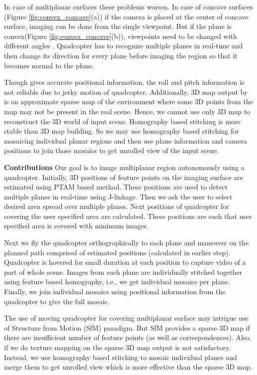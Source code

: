 In case of multiplanar surfaces these problems worsen. In case of concave
surfaces (Figure \ref{fig:convex_concave}(a)) if the camera is placed at the
center of concave surface, imaging can be done from the single viewpoint.
But if the plane is convex(Figure \ref{fig:convex_concave}(b)), viewpoints need
to be changed with different angles . Quadcopter has to recognize multiple planes
in real-time and then change its direction for every plane before imaging the
region so that it becomes normal to the plane.

Though \cite{engel} gives accurate positional information, the roll and
pitch information is not reliable due to jerky motion of quadcopter.
Additionally, 3D map output by \cite{engel} is an approximate sparse map of the
environment where some 3D points from the map may not be present in the real
scene. Hence, we cannot use only 3D map to reconstruct the 3D world of input
scene. Homography based stitching  is more stable than 3D map building. So we
may use homography based stitching for  mosaicing individual planar regions and then
use plane information and camera positions to join those mosaics to get
unrolled view of the input scene.

\textbf{Contributions}
Our goal is to image multiplanar region autonomously using a quadcopter. Initially,
3D positions of feature points on the imaging surface are estimated using PTAM
based method. These positions are used to detect multiple planes in real-time
using J-linkage. Then we ask the user to select desired area spread over
multiple planes. Next positions of quadcopter for covering the user specified
area are calculated. These positions are such that user specified area is
covered with minimum images. 

Next we fly the quadcopter orthographically to each plane and maneuver on
the planned path comprised of estimated positions (calculated in earlier step).
Quadcopter is hovered for small duration at each position to capture video of a
part of whole scene. Images from each plane are individually stitched together
using feature based homography, i.e., we get individual mosaics per plane. Finally, we join
individual mosaics using positional information from the quadcopter to give the
full mosaic.

The use of moving quadcopter for covering multiplanar surface may intrigue use
of Structure from Motion (SfM) paradigm. But SfM provides a sparse 3D map if
there are insufficient number of feature points (as well as correspondences).
Also, if we do texture mapping on the sparse 3D map output is not satisfactory.
Instead, we use homography based stitching to mosaic individual planes and merge
them to get unrolled view which is more effective than the sparse 3D map.


